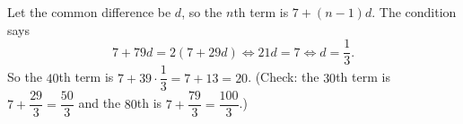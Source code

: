 Let the common difference be $d$, so the $n$th term is $7+(n-1)d$. The condition says
\[7+79d=2(7+29d)\iff 21d=7\iff d=\dfrac13.\]
So the $40$th term is $7+39\cdot\dfrac13=7+13=\boxed{20}$. (Check: the $30$th term is $7+\dfrac{29}{3}=\dfrac{50}{3}$ and the $80$th is $7+\dfrac{79}{3}=\dfrac{100}{3}$.)

